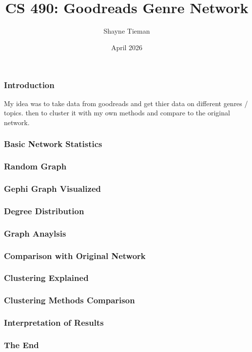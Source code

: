 \documentclass{beamer}
\title{CS 490: Goodreads Genre Network}
\author{Shayne Tieman}
\date{April 2026}
\begin{document}
  \begin{frame}
    \titlepage
  \end{frame}

  \begin{frame}
    \frametitle{Introduction}
    My idea was to take data from goodreads and get thier data on different genres / topics.
    then to cluster it with my own methods and compare to the original network.
  \end{frame}

  \begin{frame}
    \frametitle{Basic Network Statistics}
  \end{frame}
  
  \begin{frame}
    \frametitle{Random Graph}
  \end{frame}

  \begin{frame}
    \frametitle{Gephi Graph Visualized}
  \end{frame}

  \begin{frame}
    \frametitle{Degree Distribution}
  \end{frame}

  \begin{frame}
    \frametitle{Graph Anaylsis}
  \end{frame}

  \begin{frame}
    \frametitle{Comparison with Original Network}
  \end{frame}


  \begin{frame}
    \frametitle{Clustering Explained}
  \end{frame}


  \begin{frame}
    \frametitle{Clustering Methods Comparison}
  \end{frame}

  \begin{frame}
    \frametitle{Interpretation of Results}
  \end{frame}

  \begin{frame}
    \frametitle{The End}
  \end{frame}
\end{document}
